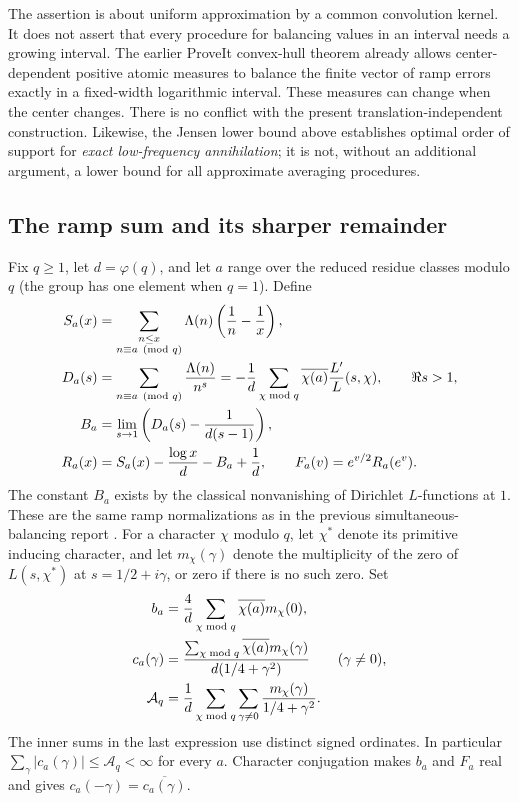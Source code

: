 The assertion is about uniform approximation by a common convolution kernel.
It does not assert that every procedure for balancing values in an interval
needs a growing interval.  The earlier ProveIt convex-hull theorem \cite{priorbalance} already
allows center-dependent positive atomic measures to balance the finite vector
of ramp errors exactly in a fixed-width logarithmic interval.  These measures
can change when the center changes.  There is no conflict with the present
translation-independent construction.  Likewise, the Jensen lower bound above
establishes optimal order of support for \emph{exact low-frequency
annihilation}; it is not, without an additional argument, a lower bound for
all approximate averaging procedures.

\subsection{The ramp sum and its sharper remainder}

Fix $q\ge1$, let $d=\varphi(q)$, and let $a$ range over the reduced residue
classes modulo $q$ (the group has one element when $q=1$).  Define
\begin{align}
 S_a(x)&=\sum_{\substack{n\le x\\ n\equiv a\pmod q}}
              \Lambda(n)\left(\frac1n-\frac1x\right),\notag\\
 D_a(s)&=\sum_{n\equiv a\pmod q}\frac{\Lambda(n)}{n^s}
       =-\frac1d\sum_{\chi\bmod q}\overline{\chi(a)}
                         \frac{L'}{L}(s,\chi),\qquad \Re s>1,\notag\\
 B_a&=\lim_{s\to1}\left(D_a(s)-\frac{1}{d(s-1)}\right),\notag\\
 R_a(x)&=S_a(x)-\frac{\log x}{d}-B_a+\frac1d,
       \qquad F_a(v)=e^{v/2}R_a(e^v).\label{eq:app-ramp-def}
\end{align}
The constant $B_a$ exists by the classical nonvanishing of Dirichlet
$L$-functions at $1$.  These are the same ramp normalizations as in the
previous simultaneous-balancing report \cite{priorbalance}.  For a character $\chi$ modulo $q$,
let $\chi^*$ denote its primitive inducing character, and let
$m_\chi(\gamma)$ denote the multiplicity of the zero of $L(s,\chi^*)$ at
$s=1/2+i\gamma$, or zero if there is no such zero.  Set
\begin{align}
 b_a&=\frac4d\sum_{\chi\bmod q}\overline{\chi(a)}m_\chi(0),\notag\\
 c_a(\gamma)&=
 \frac{\sum_{\chi\bmod q}\overline{\chi(a)}m_\chi(\gamma)}
 {d(1/4+\gamma^2)}\qquad(\gamma\ne0),\notag\\
 \mathcal A_q&=\frac1d\sum_{\chi\bmod q}
                  \sum_{\gamma\ne0}\frac{m_\chi(\gamma)}{1/4+\gamma^2}.
 \label{eq:app-ramp-coeff}
\end{align}
The inner sums in the last expression use distinct signed ordinates.  In
particular $\sum_\gamma|c_a(\gamma)|\le\mathcal A_q<\infty$ for every
$a$.  Character conjugation makes $b_a$ and $F_a$ real and gives
$c_a(-\gamma)=\overline{c_a(\gamma)}$.

